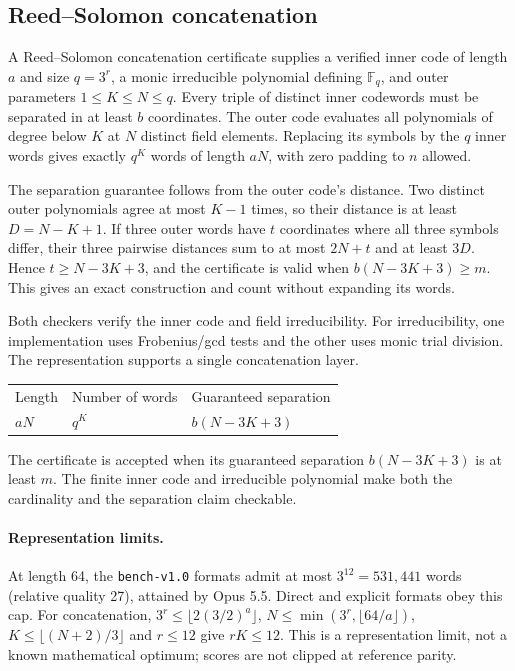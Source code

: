 \begin{minipage}{\linewidth}
\subsection{Reed--Solomon concatenation}\label{app:representation_limits}
\begin{constructionbox}[title=Construction and separation guarantee]
A Reed--Solomon concatenation certificate supplies a verified inner code of length $a$ and size $q=3^r$, a monic irreducible polynomial defining $\mathbb F_q$, and outer parameters $1\le K\le N\le q$. Every triple of distinct inner codewords must be separated in at least $b$ coordinates. The outer code evaluates all polynomials of degree below $K$ at $N$ distinct field elements. Replacing its symbols by the $q$ inner words gives exactly $q^K$ words of length $aN$, with zero padding to $n$ allowed.

The separation guarantee follows from the outer code's distance. Two distinct outer polynomials agree at most $K-1$ times, so their distance is at least $D=N-K+1$. If three outer words have $t$ coordinates where all three symbols differ, their three pairwise distances sum to at most $2N+t$ and at least $3D$. Hence $t\ge N-3K+3$, and the certificate is valid when $b(N-3K+3)\ge m$. This gives an exact construction and count without expanding its words.

Both checkers verify the inner code and field irreducibility. For irreducibility, one implementation uses Frobenius/gcd tests and the other uses monic trial division. The representation supports a single concatenation layer.
\end{constructionbox}
\begin{resultbox}[title=What the certificate establishes]
\begin{tabularx}{\linewidth}{@{}XXX@{}}
Length & Number of words & Guaranteed separation\\
$aN$ & $q^K$ & $b(N-3K+3)$
\end{tabularx}
\end{resultbox}
The certificate is accepted when its guaranteed separation $b(N-3K+3)$ is at least $m$. The finite inner code and irreducible polynomial make both the cardinality and the separation claim checkable.
\end{minipage}

\paragraph{Representation limits.}
At length 64, the \texttt{bench-v1.0} formats admit at most $3^{12}=531{,}441$ words (relative quality 27), attained by Opus 5.5. Direct and explicit formats obey this cap. For concatenation, $3^r\le\lfloor2(3/2)^a\rfloor$, $N\le\min(3^r,\lfloor64/a\rfloor)$, $K\le\lfloor(N+2)/3\rfloor$ and $r\le12$ give $rK\le12$. This is a representation limit, not a known mathematical optimum; scores are not clipped at reference parity.
